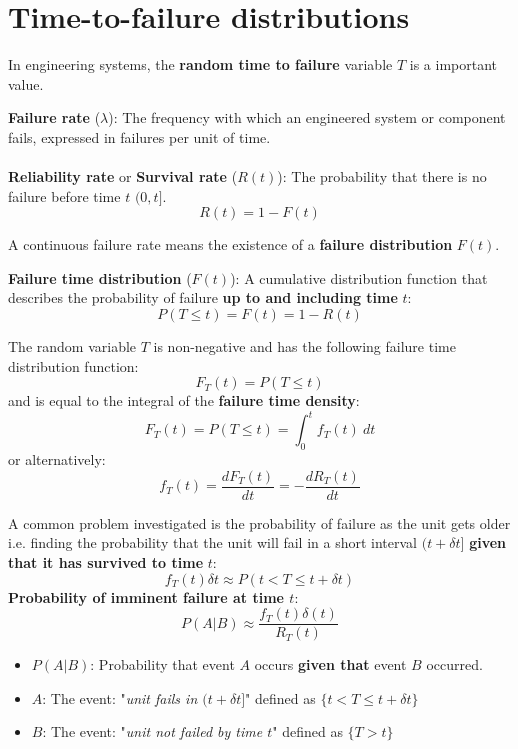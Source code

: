 \documentclass[10pt,a4paper]{article}
\begin{document}
\pagebreak

\section{Time-to-failure distributions}

In engineering systems, the \textbf{random time to failure} variable $T$ is a important value.

\begin{tcolorbox}[breakable,colback=white]
\textbf{Failure rate} ($\lambda$): The frequency with which an engineered system or component fails,
expressed in failures per unit of time.
\\
\\
\textbf{Reliability rate} or \textbf{Survival rate} ($R(t)$): The probability that there is no
failure before time $t$ $(0,t]$.
$$
    R(t) = 1 - F(t)
$$
\end{tcolorbox}

A continuous failure rate means the existence of a \textbf{failure distribution} $F(t)$.

\begin{tcolorbox}[breakable,colback=white]
\textbf{Failure time distribution} ($F(t)$): A cumulative distribution function that describes the
probability of failure \textbf{up to and including time} $t$:
$$
    P(T \leq t) = F(t) = 1 - R(t)
$$
\end{tcolorbox}

The random variable $T$ is non-negative and has the following failure time distribution function:
$$
    F_T(t) = P(T \leq t)
$$
and is equal to the integral of the \textbf{failure time density}:
$$
    F_T(t) = P(T\leq t) = \int_0^t f_T (t)\: dt
$$
or alternatively:
$$
    f_T (t) = \frac{dF_T (t)}{dt} = - \frac{dR_T(t)}{dt}
$$

A common problem investigated is the probability of failure as the unit gets older i.e. finding the
probability that the unit will fail in a short interval $(t+\delta t]$ \textbf{given that it
has survived to time} $t$:
$$
    f_T(t)\delta t \approx P(t<T\leq t+\delta t)
$$
\textbf{Probability of imminent failure at time $t$}: 
$$
    P(A|B) \approx \frac{f_T(t)\delta(t)}{R_T(t)}
$$
\begin{itemize}
    \item $P(A|B)$: Probability that event $A$ occurs \textbf{given that} event $B$ occurred.
    \item $A$: The event: "\textit{unit fails in $(t+\delta t]$}" defined as $\{t<T\leq t+\delta t\}$
    \item $B$: The event: "\textit{unit not failed by time $t$}" defined as $\{T>t\}$
\end{itemize}
\end{document}
